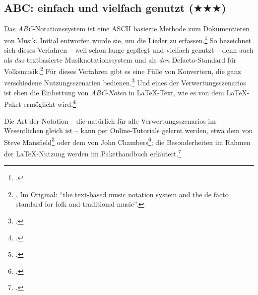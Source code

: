 %
%
%




\subsection{ABC: einfach und vielfach genutzt ($\bigstar\bigstar\bigstar$)}

Das \textit{ABC}-Notationssystem ist eine ASCII basierte Methode zum Dokumentieren
von Musik. Initial entworfen wurde sie, um die Lieder zu
erfassen.\footcite[vgl.][\nopage Subpage 'Intro']{Chambers2018a} So bezeichnet
sich dieses Verfahren -- weil schon lange gepflegt und vielfach genutzt -- denn
auch als \textit{das} textbasierte Musiknotationssystem und als \textit{den}
Defacto-Standard für Volksmusik.\footnote{\cite[vgl.][\nopage wp]{Abc2018a}. Im
Original: \enquote{the text-based music notation system and the de facto
standard for folk and traditional music}.} Für dieses Verfahren gibt es eine
Fülle von Konvertern, die ganz verschiedene Nutzungsszenarien
bedienen.\footcite[vgl.][\nopage wp]{Abc2018b} Und eines der
Verwertungsszenarios ist eben die Einbettung von \textit{ABC-Noten} in
\LaTeX-Text, wie es von dem \LaTeX-Paket ermöglicht
wird.\footcite[vgl.][\nopage wp]{CtanAbc2018a}

Die Art der Notation -- die natürlich für alle Verwertungsszenarios im
Wesentlichen gleich ist -- kann per Online-Tutorials gelernt werden, etwa dem
von Steve Mansfield\footcite[vgl.][\nopage wp]{Mansfield2016a} oder dem von
John Chambers\footcite[vgl.][\nopage wp]{Chambers2018a}; die Besonderheiten im
Rahmen der \LaTeX-Nutzung werden im Pakethandbuch
erläutert.\footcite[vgl.][\nopage wp]{Gregorio2016a}


